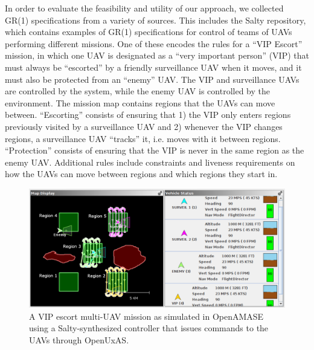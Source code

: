 \documentclass[runningheads]{llncs}
\begin{document}
In order to evaluate the feasibility and utility of our approach, we collected GR(1) specifications from a variety of sources. 
This includes the Salty repository, which contains examples of GR(1) specifications for control of teams of UAVs performing different missions. 
One of these encodes the rules for a ``VIP Escort'' mission, 
in which one UAV is designated as a ``very important person'' (VIP) that must always be ``escorted'' by a friendly surveillance UAV when it moves, 
and it must also be protected from an ``enemy'' UAV. 
The VIP and surveillance UAVs are controlled by the system, while the enemy UAV is controlled by the environment.
The mission map contains regions that the UAVs can move between.  
``Escorting'' consists of ensuring that 1) the VIP only enters regions previously visited by a surveillance UAV 
and 2) whenever the VIP changes regions, a surveillance UAV ``tracks'' it, i.e. moves with it between regions. 
``Protection'' consists of ensuring that the VIP is never in the same region as the enemy UAV. 
Additional rules include constraints and liveness requirements on how the UAVs can move between regions and which regions they start in. 

\begin{figure}
  \includegraphics[width=\textwidth]{smallMission}
  \caption{A VIP escort multi-UAV mission as simulated in OpenAMASE using a Salty-synthesized controller that issues commands to the UAVs through OpenUxAS.}
  \label{fig:vipEscort}
\end{figure}
\end{document}
